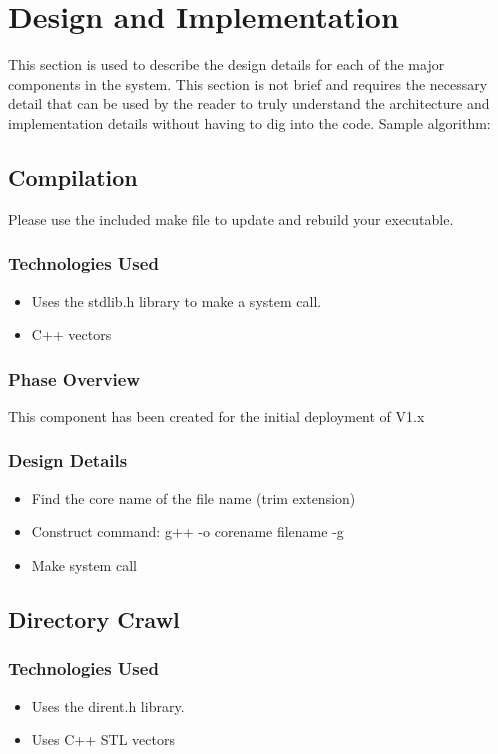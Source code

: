 \chapter{Design  and Implementation}
This section is used to describe the design details for each of the major components 
in the system.  This section is not brief and requires the necessary detail that 
can be used by the reader to truly understand the architecture and implementation 
details without having to dig into the code.    Sample algorithm: 
 

\section{Compilation}
Please use the included make file to update and rebuild your executable.

\subsection{Technologies  Used}
\begin{itemize}
\item Uses the stdlib.h library to make a system call.
\item C++ vectors
\end{itemize}

\subsection {Phase Overview}
This component has been created for the initial deployment of V1.x

\subsection{Design Details}
\begin{itemize}
\item Find the core name of the file name (trim extension)
\item Construct command: g++ -o corename filename -g
\item Make system call
\end{itemize}

\section{Directory Crawl }

\subsection{Technologies  Used}
\begin {itemize}
\item Uses the dirent.h library.
\item Uses C++ STL vectors
\end {itemize}


